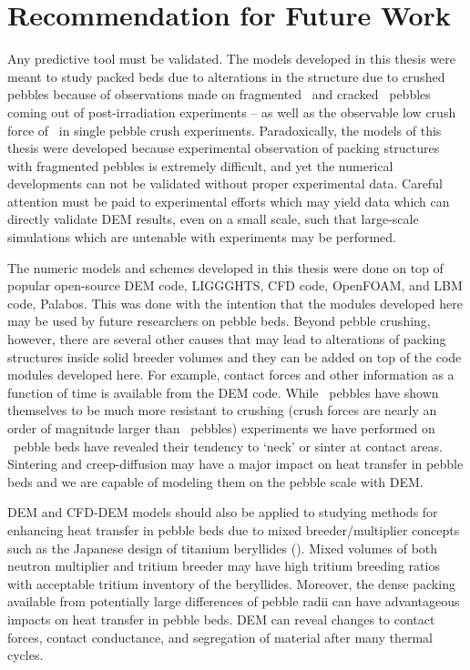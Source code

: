 \section{Recommendation for Future Work}

Any predictive tool must be validated. The models developed in this thesis were meant to study packed beds due to alterations in the structure due to crushed pebbles because of observations made on fragmented \lis~and cracked \lit~pebbles coming out of post-irradiation experiments -- as well as the observable low crush force of \lis~in single pebble crush experiments. Paradoxically, the models of this thesis were developed because experimental observation of packing structures with fragmented pebbles is extremely difficult, and yet the numerical developments can not be validated without proper experimental data. Careful attention must be paid to experimental efforts which may yield data which can directly validate DEM results, even on a small scale, such that large-scale simulations which are untenable with experiments may be performed. 

The numeric models and schemes developed in this thesis were done on top of popular open-source DEM code, LIGGGHTS, CFD code, OpenFOAM, and LBM code, Palabos. This was done with the intention that the modules developed here may be used by future researchers on pebble beds. Beyond pebble crushing, however, there are several other causes that may lead to alterations of packing structures inside solid breeder volumes and they can be added on top of the code modules developed here. For example, contact forces and other information as a function of time is available from the DEM code. While \lit~pebbles have shown themselves to be much more resistant to crushing (crush forces are nearly an order of magnitude larger than \lis~pebbles) experiments we have performed on \lit~pebble beds have revealed their tendency to `neck' or sinter at contact areas. Sintering and creep-diffusion may have a major impact on heat transfer in pebble beds and we are capable of modeling them on the pebble scale with DEM. 

DEM and CFD-DEM models should also be applied to studying methods for enhancing heat transfer in pebble beds due to mixed breeder/multiplier concepts such as the Japanese design of titanium beryllides (). Mixed volumes of both neutron multiplier and tritium breeder may have high tritium breeding ratios with acceptable tritium inventory of the beryllides. Moreover, the dense packing available from potentially large differences of pebble radii can have advantageous impacts on heat transfer in pebble beds. DEM can reveal changes to contact forces, contact conductance, and segregation of material after many thermal cycles. 

